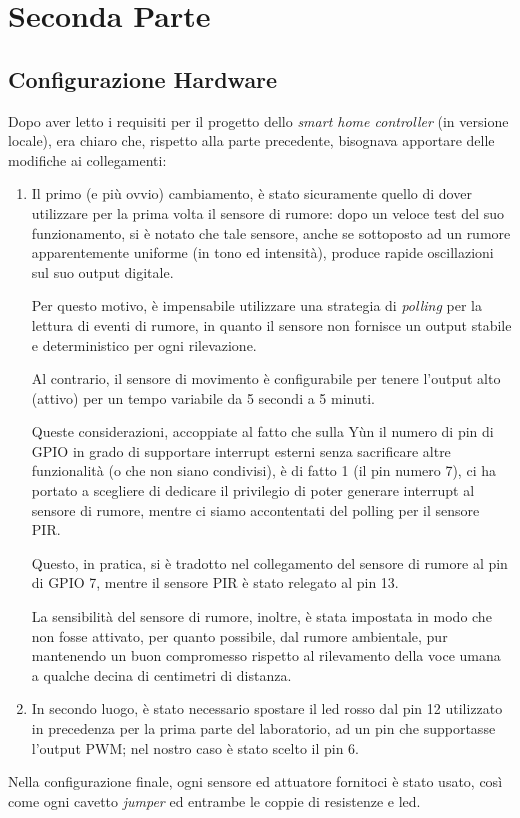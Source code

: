 \documentclass[12pt,a4paper]{article}
\begin{document}
\section{Seconda Parte}

\subsection{Configurazione Hardware}

Dopo aver letto i requisiti per il progetto dello \textit{smart home controller} (in versione locale), era chiaro che, rispetto alla parte precedente, bisognava apportare delle modifiche ai collegamenti:
\begin{enumerate}
    \item Il primo (e più ovvio) cambiamento, è stato sicuramente quello di dover utilizzare per la prima volta il sensore di rumore:
    dopo un veloce test del suo funzionamento, si è notato che tale sensore, anche se sottoposto ad un rumore apparentemente uniforme (in tono ed intensità), produce rapide oscillazioni sul suo output digitale.
    
    Per questo motivo, è impensabile utilizzare una strategia di \textit{polling} per la lettura di eventi di rumore, in quanto il sensore non fornisce un output stabile e deterministico per ogni rilevazione.
    
    Al contrario, il sensore di movimento è configurabile per tenere l'output alto (attivo) per un tempo variabile da 5 secondi a 5 minuti.
    
    Queste considerazioni, accoppiate al fatto che sulla Yùn il numero di pin di GPIO in grado di supportare interrupt esterni senza sacrificare altre funzionalità (o che non siano condivisi), è di fatto 1 (il pin numero 7), ci ha portato a scegliere di dedicare il privilegio di poter generare interrupt al sensore di rumore, mentre ci siamo accontentati del polling per il sensore PIR.
    
    Questo, in pratica, si è tradotto nel collegamento del sensore di rumore al pin di GPIO 7, mentre il sensore PIR è stato relegato al pin 13.
    
    La sensibilità del sensore di rumore, inoltre, è stata impostata in modo che non fosse attivato, per quanto possibile, dal rumore ambientale, pur mantenendo un buon compromesso rispetto al rilevamento della voce umana a qualche decina di centimetri di distanza.
    \item In secondo luogo, è stato necessario spostare il led rosso dal pin 12 utilizzato in precedenza per la prima parte del laboratorio, ad un pin che supportasse l'output PWM; nel nostro caso è stato scelto il pin 6.
\end{enumerate}
\noindent
Nella configurazione finale, ogni sensore ed attuatore fornitoci è stato usato, così come ogni cavetto \textit{jumper} ed entrambe le coppie di resistenze e led.
\end{document}
